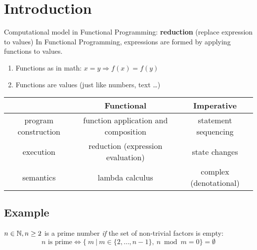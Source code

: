 


\section{Introduction} %
\label{cha:introduction}

Computational model in Functional Programming: \textbf{reduction} (replace expression to values)
In Functional Programming, expressions are formed by applying functions to values.
\begin{enumerate}
    \item Functions as in math: $x = y \Rightarrow f(x) = f(y)$
    \item Functions are values (just like numbers, text \dots)
\end{enumerate}

\begin{center}\begin{tabular}{|c|c|c|}\hline
\rowcolor{grau}                         & Functional                                & Imperative        \\\hline
                program construction    & function application and composition      & statement sequencing      \\\hline
                execution               & reduction (expression evaluation)         & state changes             \\\hline
                semantics               & lambda calculus                           & complex (denotational)    \\\hline
\end{tabular}\end{center}

\subsection*{Example}
$n \in \mathbb{N}, n \ge 2 $ is a prime number \textit{if} the set of non-trivial factors is empty:\\
$$ n \text{ is prime} \Leftrightarrow \{\ m\ |\ m \in \{2,\dots, n-1\},\ n \bmod m = 0 \} = \emptyset $$
\\

